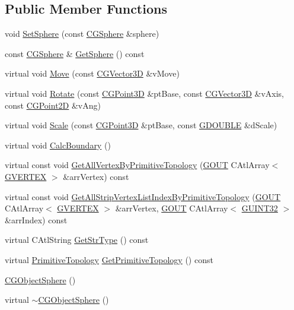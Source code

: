 \subsection*{Public Member Functions}
\begin{DoxyCompactItemize}
\item 
void \hyperlink{class_c_g_object_sphere_a2c83a333e1eb63a8aa72694c0749b0bc}{Set\+Sphere} (const \hyperlink{class_c_g_sphere}{C\+G\+Sphere} \&sphere)
\item 
const \hyperlink{class_c_g_sphere}{C\+G\+Sphere} \& \hyperlink{class_c_g_object_sphere_aff0b9951a97f5cc8b87b2fea8e126445}{Get\+Sphere} () const 
\item 
virtual void \hyperlink{class_c_g_object_sphere_a8dde30afb3b72a3d40564b2a020bcaf5}{Move} (const \hyperlink{_g_point3_d_8h_aa7e73d39f4c991acb5a13c84b498366d}{C\+G\+Vector3\+D} \&v\+Move)
\item 
virtual void \hyperlink{class_c_g_object_sphere_a8d9cfc7345adeb84120c526083c4bf2b}{Rotate} (const \hyperlink{class_c_g_point3_d}{C\+G\+Point3\+D} \&pt\+Base, const \hyperlink{_g_point3_d_8h_aa7e73d39f4c991acb5a13c84b498366d}{C\+G\+Vector3\+D} \&v\+Axis, const \hyperlink{class_c_g_point2_d}{C\+G\+Point2\+D} \&v\+Ang)
\item 
virtual void \hyperlink{class_c_g_object_sphere_a90aca25b94e122306e73c827dc944350}{Scale} (const \hyperlink{class_c_g_point3_d}{C\+G\+Point3\+D} \&pt\+Base, const \hyperlink{_g_types_8h_afd05ac85f90ee8e2a733928545462cd4}{G\+D\+O\+U\+B\+L\+E} \&d\+Scale)
\item 
virtual void \hyperlink{class_c_g_object_sphere_a396d0f04aff351f7e375ff4b1a689f49}{Calc\+Boundary} ()
\item 
virtual const void \hyperlink{class_c_g_object_sphere_a110b7461841b9a43ed9e9c7854830c8d}{Get\+All\+Vertex\+By\+Primitive\+Topology} (\hyperlink{_g_types_8h_a0858ec221262e635612871d70ca233ad}{G\+O\+U\+T} C\+Atl\+Array$<$ \hyperlink{struct_g_v_e_r_t_e_x}{G\+V\+E\+R\+T\+E\+X} $>$ \&arr\+Vertex) const 
\item 
virtual const void \hyperlink{class_c_g_object_sphere_a5d7675337db987bcce5984eb2c94085e}{Get\+All\+Strip\+Vertex\+List\+Index\+By\+Primitive\+Topology} (\hyperlink{_g_types_8h_a0858ec221262e635612871d70ca233ad}{G\+O\+U\+T} C\+Atl\+Array$<$ \hyperlink{struct_g_v_e_r_t_e_x}{G\+V\+E\+R\+T\+E\+X} $>$ \&arr\+Vertex, \hyperlink{_g_types_8h_a0858ec221262e635612871d70ca233ad}{G\+O\+U\+T} C\+Atl\+Array$<$ \hyperlink{_g_types_8h_a2e1a1c77d1349057202e2f34e071019c}{G\+U\+I\+N\+T32} $>$ \&arr\+Index) const 
\item 
virtual C\+Atl\+String \hyperlink{class_c_g_object_sphere_a113116ed379a7d5aafa5ee2be939e00f}{Get\+Str\+Type} () const 
\item 
virtual \hyperlink{_g_types_8h_a940e3da6a9b57aae3de0b050e2a7af5e}{Primitive\+Topology} \hyperlink{class_c_g_object_sphere_ae2ed5a5dd2d646143547bd71e659d41d}{Get\+Primitive\+Topology} () const 
\item 
\hyperlink{class_c_g_object_sphere_ae47dbaf1bee48266552b6dd0bcb91970}{C\+G\+Object\+Sphere} ()
\item 
virtual \hyperlink{class_c_g_object_sphere_aa11cd54fc8b5f2d6d77ab20c1ad70f16}{$\sim$\+C\+G\+Object\+Sphere} ()
\end{DoxyCompactItemize}
